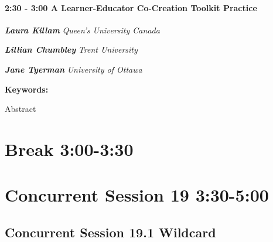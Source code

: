 \documentclass[
]{book}
\begin{document}
\begin{session}
\hypertarget{a-learner-educator-co-creation-toolkit-practice}{%
\paragraph*{\texorpdfstring{2:30 - 3:00 \textbar{} \textbf{A
Learner-Educator Co-Creation Toolkit} \textbar{}
Practice}{2:30 - 3:00 \textbar{} A Learner-Educator Co-Creation Toolkit \textbar{} Practice}}\label{a-learner-educator-co-creation-toolkit-practice}}

\textbf{\emph{Laura Killam}} \textbar{} \emph{Queen's University Canada}

\textbf{\emph{Lillian Chumbley}} \textbar{} \emph{Trent University }

\textbf{\emph{Jane Tyerman}} \textbar{} \emph{University of Ottawa}

\textbf{Keywords:}

Abstract
\end{session}

\hypertarget{break-300-330-1}{%
\section*{Break \textbar{} 3:00-3:30}\label{break-300-330-1}}

\hypertarget{concurrent-session-19-330-500}{%
\section*{Concurrent Session 19 \textbar{} 3:30-5:00}\label{concurrent-session-19-330-500}}

\hypertarget{concurrent-session-19.1-wildcard}{%
\subsection*{Concurrent Session 19.1 \textbar{} Wildcard}\label{concurrent-session-19.1-wildcard}}
\end{document}
